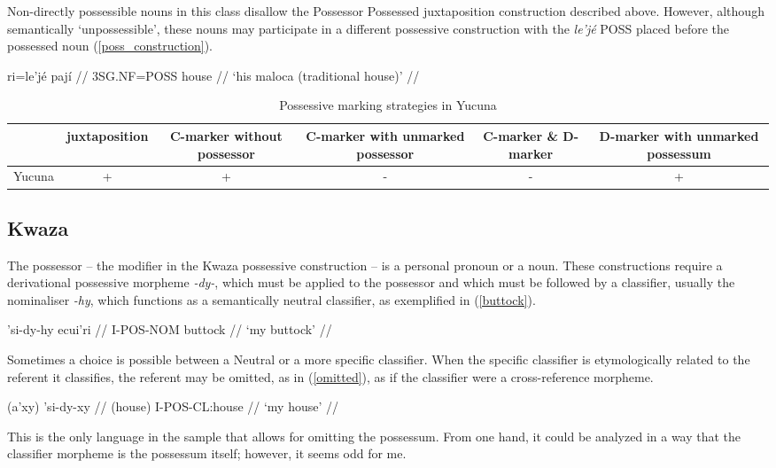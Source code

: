Non-directly possessible nouns in this class disallow the Possessor Possessed juxtaposition construction described above. However, although semantically `unpossessible', these nouns may participate in a different possessive construction with the \textit{le'jé} POSS placed before the possessed noun (\ref{poss_construction}).

\ex \label{poss_construction}
\begingl
\gla ri=le'jé pají //
\glb 3SG.NF=POSS house //
\glft ‘his maloca (traditional house)’ //
\endgl
\xe

\begin{table}[h!]
	\centering
	\small
	\begin{tabular}{@{}cccccc@{}}
		\toprule
		& juxtaposition & \parbox{2.5cm}{C-marker without possessor} & \parbox{2.75cm}{C-marker with unmarked possessor} & \parbox{1.75cm}{C-marker \& D-marker} & \parbox{3cm}{D-marker with unmarked possessum} \\ \midrule
		Yucuna & + & + & - & - & + \\ \bottomrule
	\end{tabular}
	\caption{Possessive marking strategies in Yucuna}
\end{table}

\subsection{Kwaza}

The possessor -- the modifier in the Kwaza possessive construction -- is a personal pronoun or a noun. These constructions require a derivational possessive morpheme \textit{-dy-}, which must be applied to the possessor and which must be followed by a classifier, usually the nominaliser \textit{-hy}, which functions as a semantically neutral classifier, as exemplified in (\ref{buttock}).

\ex\label{buttock}
\begingl
\gla 'si-dy-hy ecui'ri //
\glb I-POS-NOM buttock //
\glft `my buttock' //
\endgl
\xe

Sometimes a choice is possible between a Neutral or a more specific classifier. When the specific classifier is etymologically related to the referent it classifies, the referent may be omitted, as in (\ref{omitted}), as if the classifier were a cross-reference morpheme.

\ex \label{omitted}
\begingl
\gla (a'xy) 'si-dy-xy //
\glb (house) I-POS-CL:house //
\glft `my house' //
\endgl
\xe

This is the only language in the sample that allows for omitting the possessum. From one hand, it could be analyzed in a way that the classifier morpheme is the possessum itself; however, it seems odd for me.
 
